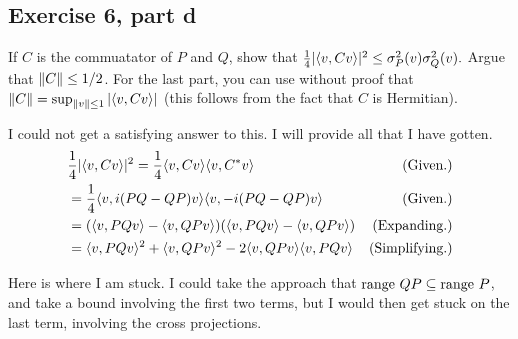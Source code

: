 \newpage
\subsection{Exercise 6, part d}
If $C$ is the commuatator of $P$ and $Q$, show that $\frac{1}{4}|\langle v, Cv \rangle|^2 \leq \sigma_P^2(v) \sigma_Q^2(v).$ Argue that $\norm{C} \leq 1/2$. For the last part, you can use without proof that $\norm{C} = \sup_{\norm{v}\leq 1} |\langle v, Cv \rangle|$ (this follows from the fact that $C$ is Hermitian).
\partbreak
\begin{solution}

    I could not get a satisfying answer to this. I will provide all that I have gotten.
    \tightalignbreak
    \begin{align*}
        &\frac{1}{4}|\langle v, Cv \rangle|^2 = \frac{1}{4}\langle v, Cv \rangle\langle v, C^{*} v \rangle &\text{(Given.)}\\
        &= \frac{1}{4}\langle v, i(PQ - QP)v \rangle\langle v, -i(PQ-QP)v \rangle &\text{(Given.)}\\
        &= (\langle v, PQv \rangle - \langle v, QPv \rangle)(\langle v, PQv \rangle - \langle v, QPv \rangle)&\text{(Expanding.)}\\
        &= \langle v, PQv \rangle^2 + \langle v, QPv \rangle^2 - 2\langle v, QPv \rangle\langle v, PQv \rangle &\text{(Simplifying.)}
    \end{align*}\vspace{-12mm}\alignbreak
    
    Here is where I am stuck. I could take the approach that $\text{range } QP \subseteq \text{range } P$, and take a bound involving the first two terms, but I would then get stuck on the last term, involving the cross projections.  
\end{solution}

